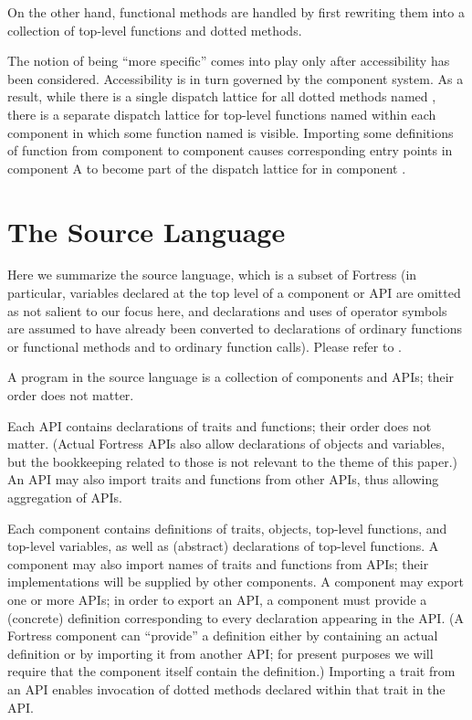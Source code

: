 On the other hand, functional methods are handled by first rewriting them
into a collection of top-level functions and dotted methods.

The notion of being ``more specific'' comes into play only after
accessibility has been considered.  Accessibility is in turn governed
by the component system.  As a result, while there is a single dispatch
lattice for all dotted methods named ,
there is a separate dispatch lattice for top-level functions named 
within each component in which some function named  is visible.
Importing some definitions of function  from component  to component 
causes corresponding entry points in component A to become part of the
dispatch lattice for  in component .


\section{The Source Language}

Here we summarize the source language, which is a subset of Fortress (in
particular, variables declared at the top level of a component or API are
omitted as not salient to our focus here, and declarations and uses of operator
symbols are assumed to have already been converted to declarations of ordinary
functions or functional methods and to ordinary function calls).
Please refer to .

A program in the source language is a collection of components and APIs; their order does not matter.

Each API contains declarations of traits and functions; their order does not matter.
(Actual Fortress APIs also allow declarations of objects and variables, but the bookkeeping
related to those is not relevant to the theme of this paper.)
An API may also import traits and functions from other APIs,
thus allowing aggregation of APIs.

Each component contains definitions of traits, objects, top-level functions, and top-level variables,
as well as (abstract) declarations of top-level functions.  A component may also import names of
traits and functions from APIs; their implementations will be supplied by other components.
A component may export one or more APIs; in order to export an API, a component must
provide a (concrete) definition corresponding to every declaration appearing in the API.
(A Fortress component can ``provide'' a definition either by containing an actual definition
or by importing it from another API; for present purposes we will require that the
component itself contain the definition.)  Importing a trait from an API enables invocation of
dotted methods declared within that trait in the API.

